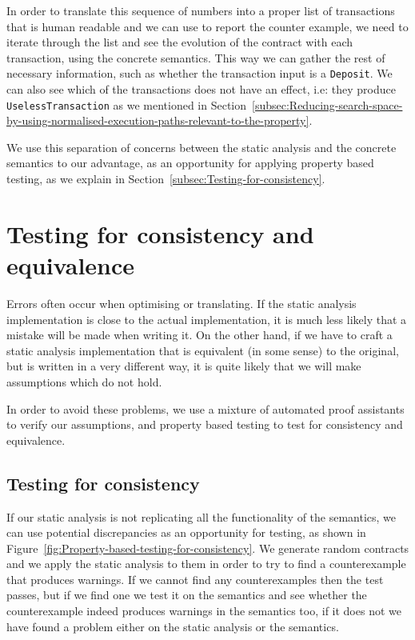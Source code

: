 \documentclass[english,runningheads]{llncs}
\begin{document}
In order to translate this sequence of numbers into a proper list
of transactions that is human readable and we can use to report the
counter example, we need to iterate through the list and see the evolution
of the contract with each transaction, using the concrete semantics.
This way we can gather the rest of necessary information, such as
whether the transaction input is a \texttt{Deposit}. We can also see
which of the transactions does not have an effect, i.e: they produce
\texttt{UselessTransaction} as we mentioned in Section~\ref{subsec:Reducing-search-space-by-using-normalised-execution-paths-relevant-to-the-property}.

We use this separation of concerns between the static analysis and
the concrete semantics to our advantage, as an opportunity for applying
property based testing, as we explain in Section~\ref{subsec:Testing-for-consistency}.

\section{Testing for consistency and equivalence\label{sec:Testing}}

Errors often occur when optimising or translating. If the static analysis
implementation is close to the actual implementation, it is much less
likely that a mistake will be made when writing it. On the other hand,
if we have to craft a static analysis implementation that is equivalent
(in some sense) to the original, but is written in a very different
way, it is quite likely that we will make assumptions which do not
hold.

In order to avoid these problems, we use a mixture of automated proof
assistants to verify our assumptions, and property based testing to
test for consistency and equivalence. 

\subsection{Testing for consistency\label{subsec:Testing-for-consistency} }

If our static analysis is not replicating all the functionality of
the semantics, we can use potential discrepancies as an opportunity
for testing, as shown in Figure~\ref{fig:Property-based-testing-for-consistency}.
We generate random contracts and we apply the static analysis to them
in order to try to find a counterexample that produces warnings. If
we cannot find any counterexamples then the test passes, but if we
find one we test it on the semantics and see whether the counterexample
indeed produces warnings in the semantics too, if it does not we have
found a problem either on the static analysis or the semantics.
\end{document}
